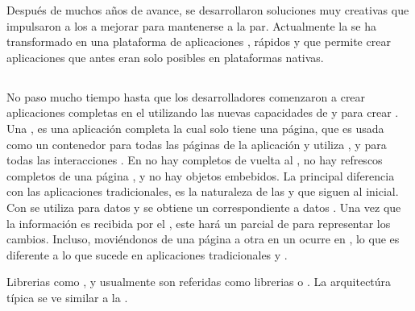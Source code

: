 Después de muchos años de avance, se desarrollaron soluciones muy creativas que impulsaron a los \browsersINT a mejorar para mantenerse a la par. 
Actualmente la \webINT se ha transformado en una plataforma de aplicaciones \fullyfeatured, \runtimes \javaScriptNAME rápidos y \standard \htmlfive que permite crear aplicaciones que antes eran solo posibles en plataformas nativas.

\subsection{\singlePageAppINT}

No paso mucho tiempo hasta que los desarrolladores comenzaron a crear aplicaciones completas en el \browserINT utilizando las nuevas capacidades de \javaScriptNAME y \htmlfive para crear \singlePageAppINT. Una \spa, es una aplicación \webINT completa la cual solo tiene una página, que es usada como un contenedor para todas las páginas \webINT de la aplicación y utiliza \javaScriptNAME, \htmlfive y \cssNAME para todas las interacciones \frontEndsAS. En \spas no hay \posts completos de vuelta al \serverAS, no hay refrescos completos de una página \webINT, y no hay objetos embebidos. La principal diferencia con las aplicaciones \webINT tradicionales, es la naturaleza de las \requests y \responsesINT que siguen al \requestINT \httpNAME inicial. Con \spa se utiliza \ajaxNAME para \requestINT datos y se obtiene un \response correspondiente a datos \json. Una vez que la información es recibida por el \clientAS, este hará un \render parcial de \htmlNAME para representar los cambios. Incluso, moviéndonos de una página a otra en un \spa ocurre en \clientSideAS, lo que es diferente a lo que sucede en aplicaciones tradicionales y \ria.

Librerias como \backbonejsNAME \emberjsName, y \angularjsNAME usualmente son referidas como librerias \clientSideAS \mvcAS o \mvvmAS. La arquitectúra típica \clientSideAS \mvcAS se ve similar a la . 




